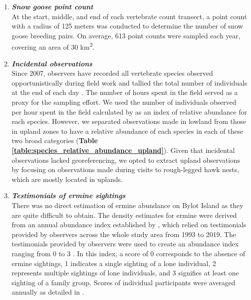 \documentclass[a4paper,twoside,12pt]{article}
\begin{document}
\begin{enumerate}[label=\roman*]
\item[] \textit{\textbf{Snow goose point count}}\\
At the start, middle, and end of each vertebrate count transect, a point count with a radius of 125 meters was conducted to determine the number of snow goose breeding pairs. On average, 613  point counts were sampled each year, covering an area of 30  km\textsuperscript{2}.
\\

\item[] \textit{\textbf{Incidental observations}}\\
Since 2007, observers have recorded all vertebrate species observed opportunistically during field work and tallied the total number of individuals at the end of each day \citep{gauthier2020daily, gauthier2024a}. The number of hours spent in the field served as a proxy for the sampling effort. We used the number of individuals observed per hour spent in the field calculated by \citet{gauthier2024a} as an index of relative abundance for each species. However, we separated observations made in lowland from those in upland zones to have a relative abundance of each species in each of these two broad categories (\textbf{Table \ref{table:species_relative_abundance_upland}}). Given that incidental observations lacked georeferencing, we opted to extract upland observations by focusing on observations made during visits to rough-legged hawk nests, which are mostly located in uplands. \\


\newpage

\item[] \textit{\textbf{Testimonials of ermine sightings}}\\
There was no direct estimation of ermine abundance on Bylot Island as they are quite difficult to obtain. The density estimates for ermine were derived from an annual abundance index established by \citet{bolduc2023}, which relied on testimonials provided by observers across the whole study area from 1993 to 2019. The testimonials provided by observers were used to create an abundance index ranging from 0 to 3 \citep{bolduc2023}. In this index, a score of 0 corresponds to the absence of ermine sightings, 1 indicates a single sighting of a lone individual, 2 represents multiple sightings of lone individuals, and 3 signifies at least one sighting of a family group. Scores of individual participants were averaged annually as detailed in \citet{bolduc2023}. 
\end{enumerate}
\end{document}

